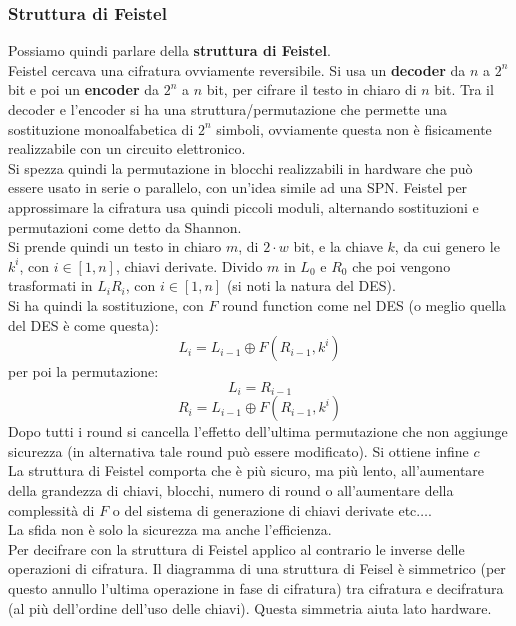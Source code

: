 \documentclass[a4paper,12pt, oneside]{book}
\begin{document}
\subsubsection{Struttura di Feistel}
Possiamo quindi parlare della \textbf{struttura di Feistel}.\\
Feistel cercava una cifratura ovviamente reversibile. Si usa un \textbf{decoder}
da $n$ a $2^n$ bit e poi un \textbf{encoder} da $2^n$ a $n$ bit, per cifrare il
testo in 
chiaro di $n$ bit. Tra il decoder e l'encoder si ha una 
struttura/permutazione che permette una sostituzione monoalfabetica di $2^n$
simboli, ovviamente questa non è fisicamente realizzabile con un circuito
elettronico.\\  
Si spezza quindi la permutazione in blocchi realizzabili in hardware che può
essere usato in serie o parallelo, con un'idea simile ad una SPN. Feistel per
approssimare la cifratura usa quindi piccoli moduli, alternando sostituzioni e
permutazioni come detto da Shannon.\\
Si prende quindi un testo in chiaro $m$, di $2\cdot w$ bit, e la chiave $k$, da
cui genero le $k^i$, con $i\in[1,n]$, chiavi derivate. Divido $m$ in $L_0$ e
$R_0$ che poi vengono trasformati in $L_iR_i$, con $i\in[1,n]$ (si noti la
natura del DES).\\
Si ha quindi la sostituzione, con $F$ round function come nel DES (o meglio
quella del DES è come questa):
\[L_i=L_{i-1}\oplus F(R_{i-1}, k^i)\]
per poi la permutazione:
\[L_i=R_{i-1}\]
\[R_i=L_{i-1}\oplus F(R_{i-1}, k^i)\]
Dopo tutti i round si cancella l'effetto dell'ultima permutazione che non
aggiunge sicurezza (in alternativa tale round può essere modificato). Si ottiene
infine $c$\\
La struttura di Feistel comporta che è più sicuro, ma più lento, all'aumentare
della grandezza di chiavi, blocchi, numero di round o all'aumentare della
complessità di $F$ o del sistema di generazione di chiavi derivate
etc$\ldots$.\\
La sfida non è solo la sicurezza ma anche l'efficienza. \\
Per decifrare con la struttura di Feistel applico al contrario le inverse delle
operazioni di cifratura. Il diagramma di una struttura di Feisel è simmetrico
(per questo annullo l'ultima operazione in fase di cifratura) tra cifratura  e
decifratura (al più dell'ordine dell'uso delle chiavi). Questa simmetria aiuta
lato hardware.
\end{document}
